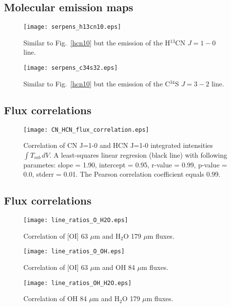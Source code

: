 \documentclass{aa}
\begin{document}
\begin{appendix} %
\section{Molecular emission maps}

\begin{figure}
\texttt{[image: serpens\_h13cn10.eps]}
\caption{Similar to Fig.~\ref{hcn10} but the emission of the H$^{13}$CN $J=1-0$ line.}
\label{h13cn10}
\end{figure}


\begin{figure}
\texttt{[image: serpens\_c34s32.eps]}
\caption{Similar to Fig.~\ref{hcn10} but the emission of the C$^{34}$S $J=3-2$ line.}
\label{c34s32}
\end{figure}

\end{appendix}

\begin{appendix} %
\section{Flux correlations}

\begin{figure}
\texttt{[image: CN\_HCN\_flux\_correlation.eps]}
\caption{Correlation of CN J=1-0 and HCN J=1-0 integrated intensities $\int{T_{mb} \, dV}$. A least-squares linear regresion (black line) with following parametes: slope = 1.90, intercept = 0.95, r-value = 0.99, p-value = 0.0, stderr = 0.01. The Pearson correlation coefficient equals 0.99. }
\label{h13cn10}
\end{figure}

\end{appendix}

\begin{appendix} %
\section{Flux correlations}

\begin{figure}
\texttt{[image: line\_ratios\_O\_H2O.eps]}
\caption{Correlation of [OI] 63 $\mu$m and H$_2$O 179 $\mu$m fluxes.}
\label{h13cn10}
\end{figure}

\begin{figure}
\texttt{[image: line\_ratios\_O\_OH.eps]}
\caption{Correlation of [OI] 63 $\mu$m and OH 84 $\mu$m fluxes.}
\label{h13cn10}
\end{figure}

\begin{figure}
\texttt{[image: line\_ratios\_OH\_H2O.eps]}
\caption{Correlation of OH 84 $\mu$m and H$_2$O 179 $\mu$m fluxes.}
\label{h13cn10}
\end{figure}

\end{appendix}
\end{document}
